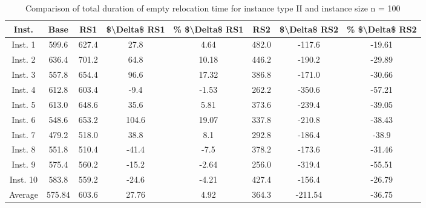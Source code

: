 \begin{table}[H]
\centering
\begin{tabular}{cccccccc}
  \hline
  \textbf{Inst.} & \textbf{Base} & \textbf{RS1} & \textbf{\$\textbackslash{}Delta\$  RS1} & \textbf{\% \$\textbackslash{}Delta\$  RS1} & \textbf{RS2} & \textbf{\$\textbackslash{}Delta\$  RS2} & \textbf{\% \$\textbackslash{}Delta\$  RS2} \\\hline
  Inst. 1 & 599.6 & 627.4 & 27.8 & 4.64 & 482.0 & -117.6 & -19.61 \\
  Inst. 2 & 636.4 & 701.2 & 64.8 & 10.18 & 446.2 & -190.2 & -29.89 \\
  Inst. 3 & 557.8 & 654.4 & 96.6 & 17.32 & 386.8 & -171.0 & -30.66 \\
  Inst. 4 & 612.8 & 603.4 & -9.4 & -1.53 & 262.2 & -350.6 & -57.21 \\
  Inst. 5 & 613.0 & 648.6 & 35.6 & 5.81 & 373.6 & -239.4 & -39.05 \\
  Inst. 6 & 548.6 & 653.2 & 104.6 & 19.07 & 337.8 & -210.8 & -38.43 \\
  Inst. 7 & 479.2 & 518.0 & 38.8 & 8.1 & 292.8 & -186.4 & -38.9 \\
  Inst. 8 & 551.8 & 510.4 & -41.4 & -7.5 & 378.2 & -173.6 & -31.46 \\
  Inst. 9 & 575.4 & 560.2 & -15.2 & -2.64 & 256.0 & -319.4 & -55.51 \\
  Inst. 10 & 583.8 & 559.2 & -24.6 & -4.21 & 427.4 & -156.4 & -26.79 \\
  Average & 575.84 & 603.6 & 27.76 & 4.92 & 364.3 & -211.54 & -36.75 \\\hline
\end{tabular}
\caption{Comparison of total duration of empty relocation time for instance type II and instance size n = 100}
\label{tab:wait:resrelocation-empty-relocation-comparison_II_100}
\end{table}
